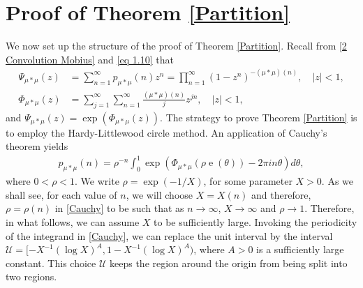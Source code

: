 \documentclass[11pt]{amsart}
\numberwithin{equation}{section}
\numberwithin{figure}{section}
\theoremstyle{definition}
\newcommand{\e}{\operatorname{e}}
\begin{document}
\section{Proof of Theorem \ref{Partition}} \label{sec:partitions}
We now set up the structure of the proof of Theorem \ref{Partition}. Recall from \eqref{2 Convolution Mobius} and \eqref{eq 1.10} that
\begin{align*}
    \Psi_{\mu*\mu}(z) &= \sum_{n=1}^\infty p_{\mu*\mu}(n) z^n = \prod_{n=1}^\infty (1-z^n)^{-(\mu*\mu)(n)}, \quad \lvert z \rvert <1, \\
    \Phi_{\mu*\mu}(z) &= \sum_{j=1}^\infty \sum_{n=1}^\infty \frac{(\mu*\mu)(n)}{j} z^{jn}, \quad \lvert z \rvert <1,
\end{align*}
and $\Psi_{\mu*\mu}(z) = \exp(\Phi_{\mu*\mu}(z))$. The strategy to prove Theorem \ref{Partition} is to employ the Hardy-Littlewood circle method. An application of Cauchy's theorem yields
\begin{align}\label{Cauchy}
    p_{\mu*\mu}(n) = \rho^{-n} \int_0^1 \exp(\Phi_{\mu*\mu}(\rho \e(\theta))-2\pi i n \theta) d\theta,
\end{align}
where $0< \rho < 1$. We write $\rho = \exp(-1/X)$, for some parameter $X>0$. As we shall see, for each value of $n$, we will choose $X = X(n)$ and therefore, $\rho=\rho(n)$ in \eqref{Cauchy} to be such that as $n \to \infty$, $X \to \infty$ and $\rho \to 1$. Therefore, in what follows, we can assume $X$ to be sufficiently large. Invoking the periodicity of the integrand in \eqref{Cauchy}, we can replace the unit interval by the interval $\mathcal{U} = [-X^{-1} (\log X)^A ,1-X^{-1} (\log X)^A)$, where $A>0$ is a sufficiently large constant. This choice $\mathcal{U}$ keeps the region around the origin from being split into two regions.\\
\end{document}
